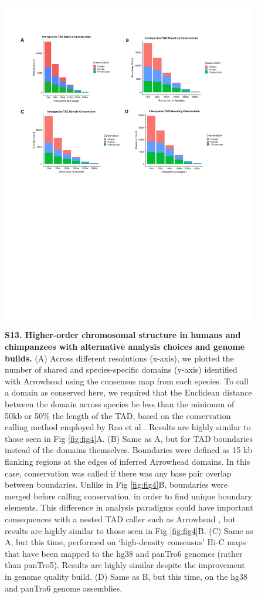 \begin{figure}[!htb]
\centering
\includegraphics[width=6in]{img/figS13.pdf}
\caption[Higher-order chromosomal structure in humans and chimpanzees with alternative analysis choices and genome builds.]{\textbf{S13. Higher-order chromosomal structure in humans and chimpanzees with alternative analysis choices and genome builds.} (A) Across different resolutions (x-axis), we plotted the number of shared and species-specific domains (y-axis) identified with Arrowhead \cite{Durand.2016} using the consensus map from each species. To call a domain as conserved here, we required that the Euclidean distance between the domain across species be less than the minimum of 50kb or 50\% the length of the TAD, based on the conservation calling method employed by Rao et al \cite{Rao.2014}. Results are highly similar to those seen in Fig \ref{fig:fig4}A. (B) Same as A, but for TAD boundaries instead of the domains themselves. Boundaries were defined as 15 kb flanking regions at the edges of inferred Arrowhead domains. In this case, conservation was called if there was any base pair overlap between boundaries. Unlike in Fig \ref{fig:fig4}B, boundaries were merged before calling conservation, in order to find unique boundary elements. This difference in analysis paradigms could have important consequences with a nested TAD caller such as Arrowhead \cite{Durand.2016}, but results are highly similar to those seen in Fig \ref{fig:fig4}B. (C) Same as A, but this time, performed on `high-density consensus' Hi-C maps that have been mapped to the hg38 and panTro6 genomes (rather than panTro5). Results are highly similar despite the improvement in genome quality build. (D) Same as B, but this time, on the hg38 and panTro6 genome assemblies.}

\end{figure}
